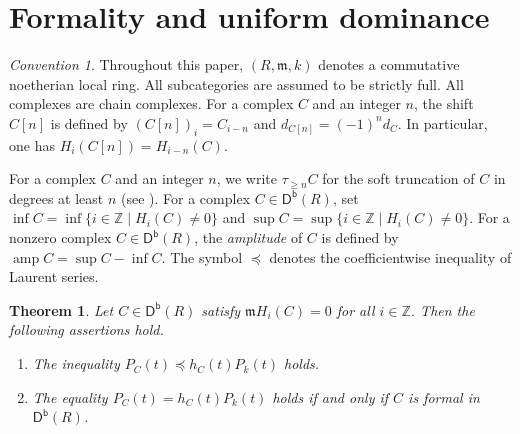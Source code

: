 \documentclass[10pt]{amsart}
\newtheorem{thm}{Theorem}[section]
\theoremstyle{definition}
\theoremstyle{remark}
\newtheorem*{conv}{Convention}
\numberwithin{equation}{thm}
\def\amp{\operatorname{amp}}
\def\db{\operatorname{\mathsf{D^b}}}
\def\ge{\geqslant}
\def\inf{\operatorname{inf}}
\def\m{\mathfrak{m}}
\def\sup{\operatorname{sup}}
\def\ZZ{\mathbb{Z}}
\begin{document}
\section{Formality and uniform dominance}
\begin{conv}
Throughout this paper, $(R,\m,k)$ denotes a commutative noetherian local ring. 
All subcategories are assumed to be strictly full. 
All complexes are chain complexes.
For a complex $C$ and an integer $n$, the shift $C[n]$ is defined by $(C[n])_i=C_{i-n}$ and $d_{C[n]}=(-1)^n d_C$. 
In particular, one has $H_i(C[n])=H_{i-n}(C)$.
\end{conv}
For a complex $C$ and an integer $n$, we write $\tau_{\ge n}C$ for the soft truncation of $C$ in degrees at least $n$ (see \cite[1.2]{CH2010}).
For a complex $C\in\db(R)$, set $\inf C=\inf\{i\in\ZZ\mid H_i(C)\ne0\}$ and $\sup C=\sup\{i\in\ZZ\mid H_i(C)\ne0\}$. 
For a nonzero complex $C\in\db(R)$, the {\em amplitude} of $C$ is defined by $\amp C=\sup C-\inf C$.
The symbol $\preccurlyeq$ denotes the coefficientwise inequality of Laurent series.
\begin{thm}\label{form}
Let $C\in\db(R)$ satisfy $\m H_i(C)=0$ for all $i\in\ZZ$. 
Then the following assertions hold.
\begin{enumerate}[\rm(1)]
\item
The inequality $P_C(t)\preccurlyeq h_C(t)P_k(t)$ holds.
\item 
The equality $P_C(t)=h_C(t)P_k(t)$ holds if and only if $C$ is formal in $\db(R)$.
\end{enumerate}
\end{thm}
\end{document}
